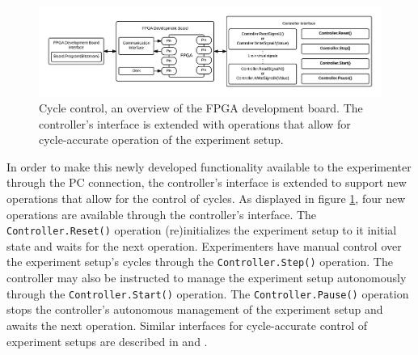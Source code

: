 \documentclass[main.tex]{subfiles}
\begin{document}


\begin{figure}[h!]
\centering
\caption{Cycle control, an overview of the FPGA development board. The controller's interface is extended with operations that allow for cycle-accurate operation of the experiment setup.}
\label{fig:overview-control}
\includegraphics[width=\textwidth]{img/overview-control}
\end{figure}

In order to make this newly developed functionality available to the experimenter through the PC connection, the controller's interface is extended to support new operations that allow for the control of cycles. As displayed in figure \ref{fig:overview-control}, four new operations are available through the controller's interface. The \texttt{Controller.Reset()} operation (re)initializes the experiment setup to it initial state and waits for the next operation. Experimenters have manual control over the experiment setup's cycles through the \texttt{Controller.Step()} operation. The controller may also be instructed to manage the experiment setup autonomously through the \texttt{Controller.Start()} operation. The \texttt{Controller.Pause()} operation stops the controller's autonomous management of the experiment setup and awaits the next operation. Similar interfaces for cycle-accurate control of experiment setups are described in \cite{holland2003harnessing} and \cite{bulic2013fpga}.
\end{document}
